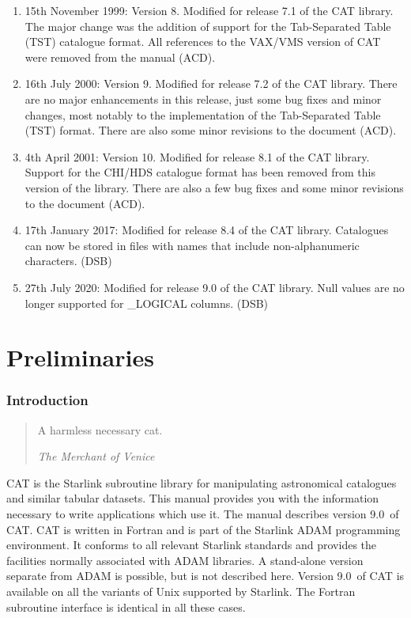 \documentclass[11pt,twoside]{starlink}
\providecommand{\CATversion}{9.0~}
\begin{document}
\begin{enumerate}
  \item 15th November 1999: Version 8. Modified for release 7.1 of the
   CAT library.  The major change was the addition of support for the
   Tab-Separated Table (TST) catalogue format.  All references to
   the VAX/VMS version of CAT were removed from the manual (ACD).

  \item 16th July 2000: Version 9.  Modified for release 7.2 of the
   CAT library.  There are no major enhancements in this release, just
   some bug fixes and minor changes, most notably to the implementation
   of the Tab-Separated Table (TST) format.  There are also some minor
   revisions to the document (ACD).

  \item 4th April 2001: Version 10.  Modified for release 8.1 of the
   CAT library.  Support for the CHI/HDS catalogue format has been removed
   from this version of the library.  There are also a few bug fixes and
   some minor revisions to the document (ACD).

  \item 17th January 2017: Modified for release 8.4 of the CAT library.
   Catalogues can now be stored in files with names that include
   non-alphanumeric characters. (DSB)
  \item 27th July 2020: Modified for release 9.0 of the CAT library.
   Null values are no longer supported for \_LOGICAL columns. (DSB)

\end{enumerate}


\part{Preliminaries}


\section{\label{INTRO}Introduction}

\begin{quote}
\begin{center}
A harmless necessary cat.
\end{center}
\textit{The Merchant of Venice} \latex{\raggedleft}
\end{quote}


CAT is the Starlink subroutine library for manipulating astronomical
catalogues and similar tabular datasets. This manual provides you with
the information necessary to write applications which use it. The manual
describes version \CATversion of CAT. CAT is written in Fortran
and is part of the Starlink ADAM programming environment. It conforms
to all relevant Starlink standards and provides the facilities normally
associated with ADAM libraries. A stand-alone version separate from ADAM
is possible, but is not described here. Version \CATversion of CAT is
available on all the variants of Unix supported by Starlink.  The Fortran
subroutine interface is identical in all these cases.
\end{document}
